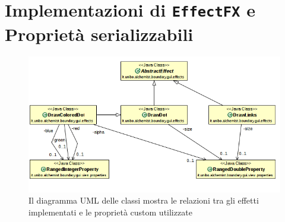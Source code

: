 \chapter{Implementazioni di \texttt{EffectFX} e Proprietà serializzabili}\label{appendix:effectsAndProps}
    \begin{figure}[htbp]
      \centering
      \includegraphics[scale=0.7]{img/EffectAndPropertiesUML}
      \caption{Il diagramma UML delle classi mostra le relazioni tra gli effetti implementati e le proprietà custom utilizzate}
    \end{figure}
